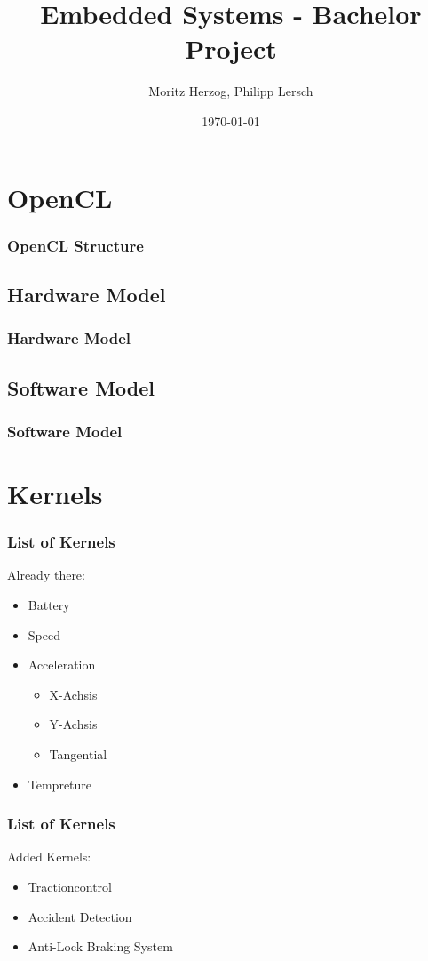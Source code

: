 \documentclass{beamer}
\title{Embedded Systems - Bachelor Project}
\author{Moritz Herzog, Philipp Lersch}
\date{\today}
\begin{document}
\maketitle


\section{OpenCL}
\begin{frame}
    \frametitle{OpenCL Structure}
    
\end{frame}
\subsection{Hardware Model}
\begin{frame}
    \frametitle{Hardware Model}
\end{frame}
\subsection{Software Model}
\begin{frame}
    \frametitle{Software Model}
\end{frame}

\section{Kernels}
\begin{frame} %
  \frametitle{List of Kernels} %
  Already there:
  \begin{itemize}
   \item Battery
   \item Speed
   \item Acceleration
   \begin{itemize}
    \item X-Achsis
    \item Y-Achsis
    \item Tangential
   \end{itemize}
   \item Tempreture
  \end{itemize}

\end{frame}
\begin{frame}
    \frametitle{List of Kernels}
    Added Kernels:
    \begin{itemize}
     \item Tractioncontrol
     \item Accident Detection
     \item Anti-Lock Braking System
    \end{itemize}
\end{frame}
\end{document}
